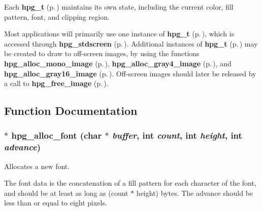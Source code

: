 Each {\bf hpg\_\-t} {\rm (p.\,\pageref{hpgraphics_8h_a24})} maintains its own state, including the current color, fill pattern, font, and clipping region.

Most applications will primarily use one instance of {\bf hpg\_\-t} {\rm (p.\,\pageref{hpgraphics_8h_a24})}, which is accessed through {\bf hpg\_\-stdscreen} {\rm (p.\,\pageref{hpgraphics_8h_a27})}. Additional instances of {\bf hpg\_\-t} {\rm (p.\,\pageref{hpgraphics_8h_a24})} may be created to draw to off-screen images, by using the functions {\bf hpg\_\-alloc\_\-mono\_\-image} {\rm (p.\,\pageref{hpgraphics_8h_a75})}, {\bf hpg\_\-alloc\_\-gray4\_\-image} {\rm (p.\,\pageref{hpgraphics_8h_a76})}, and {\bf hpg\_\-alloc\_\-gray16\_\-image} {\rm (p.\,\pageref{hpgraphics_8h_a77})}. Off-screen images should later be released by a call to {\bf hpg\_\-free\_\-image} {\rm (p.\,\pageref{hpgraphics_8h_a78})}. 

\subsection{Function Documentation}
\subsubsection{$\ast$ hpg\_\-alloc\_\-font (char $\ast$ {\em buffer}, int {\em count}, int {\em height}, int {\em advance})}\label{hpgraphics_8h_a72}


Allocates a new font.

The font data is the concatenation of a fill pattern for each character of the font, and should be at least as long as (count $\ast$ height) bytes. The advance should be less than or equal to eight pixels.

